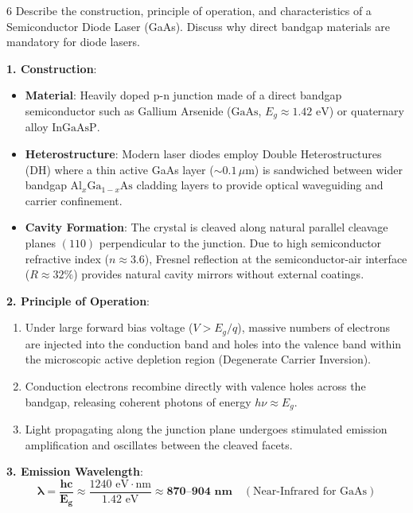 \begin{theoryq}{6}
Describe the construction, principle of operation, and characteristics of a Semiconductor Diode Laser (GaAs). Discuss why direct bandgap materials are mandatory for diode lasers.
\end{theoryq}
\begin{theorysol}
\textbf{1. Construction}:
\begin{itemize}
    \item \textbf{Material}: Heavily doped p-n junction made of a direct bandgap semiconductor such as Gallium Arsenide ($\text{GaAs}$, $E_g \approx 1.42\text{ eV}$) or quaternary alloy $\text{InGaAsP}$.
    \item \textbf{Heterostructure}: Modern laser diodes employ Double Heterostructures (DH) where a thin active GaAs layer ($\sim 0.1\,\mu\text{m}$) is sandwiched between wider bandgap $\text{Al}_x\text{Ga}_{1-x}\text{As}$ cladding layers to provide optical waveguiding and carrier confinement.
    \item \textbf{Cavity Formation}: The crystal is cleaved along natural parallel cleavage planes $(110)$ perpendicular to the junction. Due to high semiconductor refractive index ($n \approx 3.6$), Fresnel reflection at the semiconductor-air interface ($R \approx 32\%$) provides natural cavity mirrors without external coatings.
\end{itemize}

\textbf{2. Principle of Operation}:
\begin{enumerate}
    \item Under large forward bias voltage ($V > E_g/q$), massive numbers of electrons are injected into the conduction band and holes into the valence band within the microscopic active depletion region (Degenerate Carrier Inversion).
    \item Conduction electrons recombine directly with valence holes across the bandgap, releasing coherent photons of energy $h\nu \approx E_g$.
    \item Light propagating along the junction plane undergoes stimulated emission amplification and oscillates between the cleaved facets.
\end{enumerate}

\textbf{3. Emission Wavelength}:
\begin{equation}
\mathbf{\lambda = \frac{h c}{E_g}} \approx \frac{1240\text{ eV}\cdot\text{nm}}{1.42\text{ eV}} \approx \mathbf{870\text{--}904\text{ nm}} \quad (\text{Near-Infrared for GaAs})
\end{equation}


\end{theorysol}
